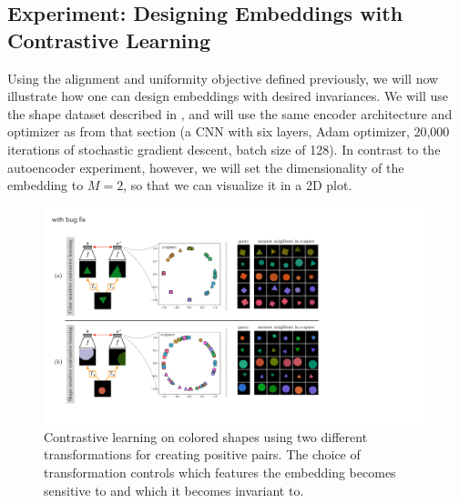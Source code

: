 \subsection{Experiment: Designing Embeddings with Contrastive Learning}\label{sec:representation_learning:expt_designing_embeddings_with_contrastive_learning}
Using the alignment and uniformity objective defined previously, we will now illustrate how one can design embeddings with desired invariances. We will use the shape dataset described in \sect{\ref{sec:representation_learning:autoencoders}}, and will use the same encoder architecture and optimizer as from that section (a CNN with six layers, Adam optimizer, 20,000 iterations of stochastic gradient descent, batch size of 128). In contrast to the autoencoder experiment, however, we will set the dimensionality of the embedding to $M=2$, so that we can visualize it in a 2D plot.

\begin{figure}[t!]
    \centerline{
        \includegraphics[width=1.0\linewidth]{figures/representation_learning/align_unif_results_shapes_dataset.pdf}}
    \caption{Contrastive learning on colored shapes using two different transformations for creating positive pairs. The choice of transformation controls which features the embedding becomes sensitive to and which it becomes invariant to.}
    \label{fig:representation_learning:align_unif_results_shapes_dataset}

\end{figure}

